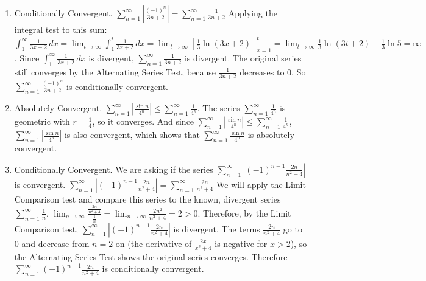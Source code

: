 \begin{Answer}[ref = absconv2]
\begin{enumerate}
\item Conditionally Convergent. $\sum_{n=1}^\infty \left| \frac{(-1)^n}{3n+2} 
\right| = \sum_{n=1}^\infty \frac{1}{3n + 2}$ Applying the integral test to 
this sum: $\int_1^\infty \frac{1}{3x+2}\,dx = \lim_{t \to \infty} \int_1^t 
\frac{1}{3x+2}\,dx = \lim_{t \to \infty} \left[ \frac{1}{3} \ln{(3x + 2)} \right]_{x=1}^t = \lim_{t 
\to \infty} \frac{1}{3}\ln{(3t + 2)} - \frac{1}{3}\ln{5} = \infty$. 
Since $\int_1^\infty \frac{1}{3x + 2}\,dx$ is divergent, $\sum_{n=1}^\infty 
\frac{1}{3n + 2}$ is divergent. The original series still converges by the
Alternating Series Test, because $\frac{1}{3n+2}$ decreases to $0$. So
$\sum_{n=1}^\infty \frac{(-1)^n}{3n + 2}$ is conditionally convergent.
\item Absolutely Convergent. $\sum_{n=1}^\infty \left| \frac{\sin{n}}{4^n} 
\right| \leq \sum_{n=1}^\infty \frac{1}{4^n}$. The series $\sum_{n=1}^\infty \frac{1}{4^n}$ is geometric with
$r = \frac{1}{4}$, so it converges. And since 
$\sum_{n=1}^\infty \left| \frac{\sin{n}}{4^n} \right| \leq \sum_{n=1}^\infty 
\frac{1}{4^n}$, $\sum_{n=1}^\infty \left| \frac{\sin{n}}{4^n} \right|$ is 
also convergent, which shows that $\sum_{n=1}^\infty \frac{\sin{n}}{4^n}$ is 
absolutely convergent. 
\item Conditionally Convergent. We are asking if the series $\sum_{n=1}^\infty 
\left| (-1)^{n-1} \frac{2n}{n^2 + 4} \right|$ is convergent. $\sum_{n=1}^
\infty \left| (-1)^{n-1} \frac{2n}{n^2 + 4} \right| = \sum_{n=1}^\infty 
\frac{2n}{n^2 + 4}$ We will apply the Limit Comparison test and compare this 
series to the known, divergent series $\sum_{n=1}^\infty \frac{1}{n}$. $\lim_{
n \to \infty} \frac{\frac{2n}{n^2 + 4}}{\frac{1}{n}} = \lim_{n \to \infty} 
\frac{2n^2}{n^2 + 4} = 2 >0$. Therefore, by the Limit Comparison test, $\sum_{
n=1}^\infty \left| (-1)^{n-1} \frac{2n}{n^2 + 4} \right|$ is divergent. The terms $\frac{2n}{n^2+4}$ go to $0$ and decrease from
$n = 2$ on (the derivative of $\frac{2x}{x^2+4}$ is negative for $x > 2$), so
the Alternating Series Test shows the original series converges. Therefore
$\sum_{n=1}^\infty (-1)^{n-1} \frac{2n}{n^2 + 4}$ is conditionally convergent. 
\end{enumerate}
\end{Answer}

